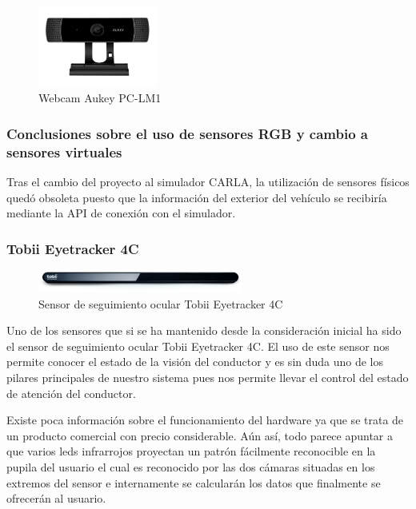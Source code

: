 \begin{figure}[h!]
    \centering
    \includegraphics[width=0.35\textwidth]{img/aukeyWebcam.jpg}
    \caption{Webcam Aukey PC-LM1}
\end{figure}


\subsubsection{Conclusiones sobre el uso de sensores RGB y cambio a sensores virtuales}

Tras el cambio del proyecto al simulador CARLA, la utilización de sensores físicos quedó obsoleta puesto que la información del exterior del vehículo se recibiría mediante la API de conexión con el simulador.

\subsubsection{Tobii Eyetracker 4C} \label{sec:tobii}

\begin{figure}[h!]
    \centering
    \includegraphics[width=0.6\textwidth]{img/tobii.png}
    \caption{Sensor de seguimiento ocular Tobii Eyetracker 4C}
\end{figure}

Uno de los sensores que si se ha mantenido desde la consideración inicial ha sido el sensor de seguimiento ocular Tobii Eyetracker 4C.
El uso de este sensor nos permite conocer el estado de la visión del conductor y es sin duda uno de los pilares principales de nuestro sistema pues nos permite llevar el control del estado de atención del conductor. 

Existe poca información sobre el funcionamiento del hardware ya que se trata de un producto comercial con precio considerable. Aún así, todo parece apuntar a que varios leds infrarrojos proyectan un patrón fácilmente reconocible en la pupila del usuario el cual es reconocido por las dos cámaras situadas en los extremos del sensor e internamente se calcularán los datos que finalmente se ofrecerán al usuario.

